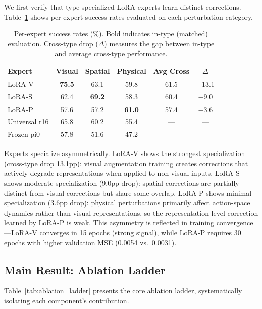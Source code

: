 \documentclass[10pt,twocolumn]{article}
\begin{document}
We first verify that type-specialized LoRA experts learn distinct corrections.
Table~\ref{tab:expert_cross} shows per-expert success rates evaluated on each perturbation category.

\begin{table}[h]
\centering
\caption{Per-expert success rates (\%). Bold indicates in-type (matched) evaluation. Cross-type drop ($\Delta$) measures the gap between in-type and average cross-type performance.}
\label{tab:expert_cross}
\small
\begin{tabular}{lccccc}
\toprule
Expert & Visual & Spatial & Physical & Avg Cross & $\Delta$ \\
\midrule
LoRA-V & \textbf{75.5} & 63.1 & 59.8 & 61.5 & $-$13.1 \\
LoRA-S & 62.4 & \textbf{69.2} & 58.3 & 60.4 & $-$9.0 \\
LoRA-P & 57.6 & 57.2 & \textbf{61.0} & 57.4 & $-$3.6 \\
\midrule
Universal r16 & 65.8 & 60.2 & 55.4 & --- & --- \\
Frozen pi0 & 57.8 & 51.6 & 47.2 & --- & --- \\
\bottomrule
\end{tabular}
\end{table}

Experts specialize asymmetrically.
LoRA-V shows the strongest specialization (cross-type drop 13.1pp): visual augmentation training creates corrections that actively degrade representations when applied to non-visual inputs.
LoRA-S shows moderate specialization (9.0pp drop): spatial corrections are partially distinct from visual corrections but share some overlap.
LoRA-P shows minimal specialization (3.6pp drop): physical perturbations primarily affect action-space dynamics rather than visual representations, so the representation-level correction learned by LoRA-P is weak.
This asymmetry is reflected in training convergence---LoRA-V converges in 15 epochs (strong signal), while LoRA-P requires 30 epochs with higher validation MSE (0.0054 vs.\ 0.0031).

\subsection{Main Result: Ablation Ladder}
\label{sec:ablation_ladder}

Table~\ref{tab:ablation_ladder} presents the core ablation ladder, systematically isolating each component's contribution.
\end{document}
